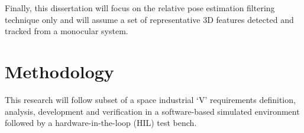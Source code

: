  Finally, this dissertation will focus on the relative pose estimation filtering technique only and will assume a set of representative 3D features detected and tracked from a monocular system. 

\section{Methodology}\label{CHAP1_5}


This research will follow subset of a space industrial ‘V’ requirements definition, analysis, development and verification in a software-based simulated environment followed by a hardware-in-the-loop (HIL) test bench. 

